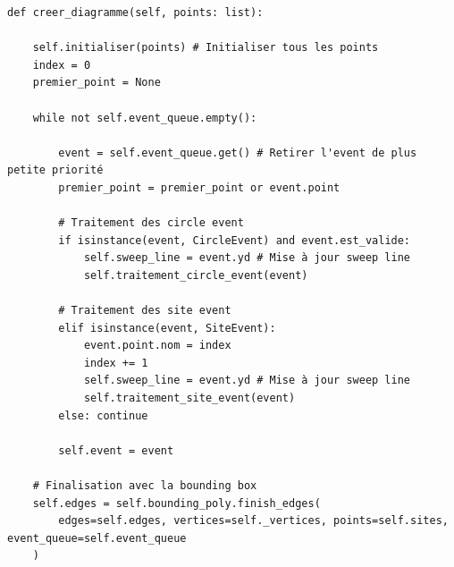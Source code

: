 \begin{frame}[fragile]
\begin{code}
\begin{verbatim}
def creer_diagramme(self, points: list):

    self.initialiser(points) # Initialiser tous les points
    index = 0
    premier_point = None

    while not self.event_queue.empty():

        event = self.event_queue.get() # Retirer l'event de plus petite priorité
        premier_point = premier_point or event.point

        # Traitement des circle event
        if isinstance(event, CircleEvent) and event.est_valide:
            self.sweep_line = event.yd # Mise à jour sweep line
            self.traitement_circle_event(event)

        # Traitement des site event
        elif isinstance(event, SiteEvent):
            event.point.nom = index
            index += 1
            self.sweep_line = event.yd # Mise à jour sweep line
            self.traitement_site_event(event)
        else: continue

        self.event = event

    # Finalisation avec la bounding box
    self.edges = self.bounding_poly.finish_edges(
        edges=self.edges, vertices=self._vertices, points=self.sites, event_queue=self.event_queue
    )
\end{verbatim}
\end{code}
\end{frame}



